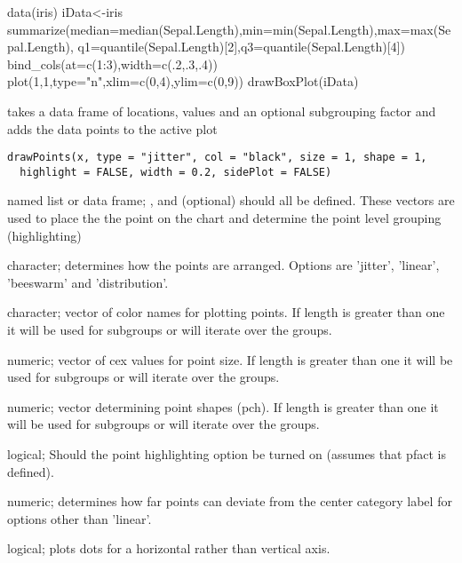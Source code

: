 \documentclass[a4paper]{book}
\begin{document}
%
\begin{Examples}
\begin{ExampleCode}
data(iris)
iData<-iris %
   summarize(median=median(Sepal.Length),min=min(Sepal.Length),max=max(Sepal.Length),
   q1=quantile(Sepal.Length)[2],q3=quantile(Sepal.Length)[4]) %
   bind_cols(at=c(1:3),width=c(.2,.3,.4))
plot(1,1,type="n",xlim=c(0,4),ylim=c(0,9))
drawBoxPlot(iData)
\end{ExampleCode}
\end{Examples}
%
\begin{Description}\relax
takes a data frame of locations, values and an optional subgrouping factor and adds the data points to the active plot
\end{Description}
%
\begin{Usage}
\begin{verbatim}
drawPoints(x, type = "jitter", col = "black", size = 1, shape = 1,
  highlight = FALSE, width = 0.2, sidePlot = FALSE)
\end{verbatim}
\end{Usage}
%
\begin{Arguments}
\begin{ldescription}
\item[\code{x}] named list or data frame; ,  and  (optional) should all be defined. These vectors are used to place the the point on the chart and determine the point level grouping (highlighting)

\item[\code{type}] character; determines how the points are arranged. Options are 'jitter', 'linear', 'beeswarm' and 'distribution'.

\item[\code{col}] character; vector of color names for plotting points. If length is greater than one it will be used for subgroups or will iterate over the groups.

\item[\code{size}] numeric; vector of cex values for point size. If length is greater than one it will be used for subgroups or will iterate over the groups.

\item[\code{shape}] numeric; vector determining point shapes (pch). If length is greater than one it will be used for subgroups or will iterate over the groups.

\item[\code{highlight}] logical; Should the point highlighting option be turned on (assumes that pfact is defined).

\item[\code{width}] numeric; determines how far points can deviate from the center category label for  options other than 'linear'.

\item[\code{sidePlot}] logical; plots dots for a horizontal rather than vertical axis.
\end{ldescription}
\end{Arguments}
\end{document}
